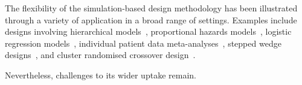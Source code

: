 \documentclass{article} %
\begin{document}
The flexibility of the simulation-based design methodology has been illustrated through a variety of application in a broad range of settings. Examples include designs involving hierarchical models~\cite{Hooper2013}, proportional hazards models~\cite{Schoenfeld2005}, logistic regression models~\cite{Grieve2016}, individual patient data meta-analyses~\cite{Sutton2007, Kontopantelis2016}, stepped wedge designs~\cite{Baio2015, Hooper2016}, and cluster randomised crossover design~\cite{Reich2012}. 

Nevertheless, challenges to its wider uptake remain.


\end{document}
